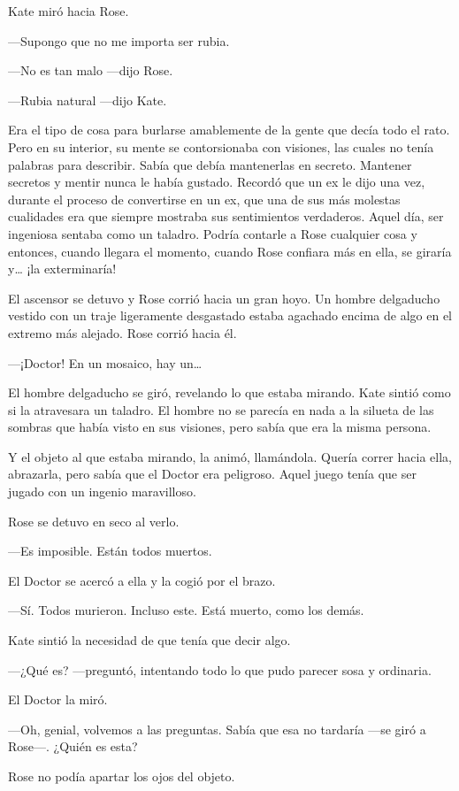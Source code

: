 Kate miró hacia Rose.

---Supongo que no me importa ser rubia.

---No es tan malo ---dijo Rose.

---Rubia natural ---dijo Kate.

Era el tipo de cosa para burlarse amablemente de la gente que decía todo
el rato. Pero en su interior, su mente se contorsionaba con visiones,
las cuales no tenía palabras para describir. Sabía que debía mantenerlas
en secreto. Mantener secretos y mentir nunca le había gustado. Recordó
que un ex le dijo una vez, durante el proceso de convertirse en un ex,
que una de sus más molestas cualidades era que siempre mostraba sus
sentimientos verdaderos. Aquel día, ser ingeniosa sentaba como un
taladro. Podría contarle a Rose cualquier cosa y entonces, cuando
llegara el momento, cuando Rose confiara más en ella, se giraría
y\ldots{} ¡la exterminaría!

El ascensor se detuvo y Rose corrió hacia un gran hoyo. Un hombre
delgaducho vestido con un traje ligeramente desgastado estaba agachado
encima de algo en el extremo más alejado. Rose corrió hacia él.

---¡Doctor! En un mosaico, hay un\ldots{}

El hombre delgaducho se giró, revelando lo que estaba mirando. Kate
sintió como si la atravesara un taladro. El hombre no se parecía en nada
a la silueta de las sombras que había visto en sus visiones, pero sabía
que era la misma persona.

Y el objeto al que estaba mirando, la animó, llamándola. Quería correr
hacia ella, abrazarla, pero sabía que el Doctor era peligroso. Aquel
juego tenía que ser jugado con un ingenio maravilloso.

Rose se detuvo en seco al verlo.

---Es imposible. Están todos muertos.

El Doctor se acercó a ella y la cogió por el brazo.

---Sí. Todos murieron. Incluso este. Está muerto, como los demás.

Kate sintió la necesidad de que tenía que decir algo.

---¿Qué es? ---preguntó, intentando todo lo que pudo parecer sosa y
ordinaria.

El Doctor la miró.

---Oh, genial, volvemos a las preguntas. Sabía que esa no tardaría ---se
giró a Rose---. ¿Quién es esta?

Rose no podía apartar los ojos del objeto.

